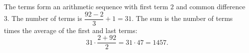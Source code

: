 The terms form an arithmetic sequence with first term $2$ and common difference $3$. The number of terms is $\dfrac{92-2}{3}+1=31$. The sum is the number of terms times the average of the first and last terms:
\[
31\cdot\dfrac{2+92}{2}=31\cdot47=\boxed{1457}.
\]
